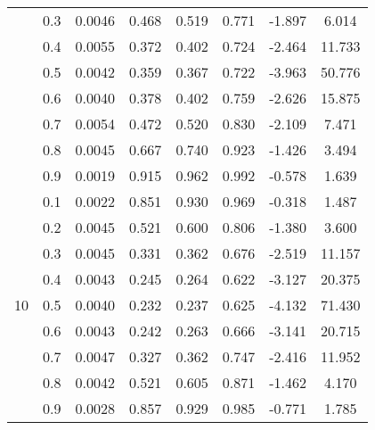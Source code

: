 \documentclass[11pt,a4paper]{report}
\begin{document}
\begin{longtable}{ | c | c || c | c | c | c | c | c | }
 & 0.3 & 0.0046 & 0.468 & 0.519 & 0.771 & -1.897 & 6.014 \\
 & 0.4 & 0.0055 & 0.372 & 0.402 & 0.724 & -2.464 & 11.733 \\
 & 0.5 & 0.0042 & 0.359 & 0.367 & 0.722 & -3.963 & 50.776 \\
 & 0.6 & 0.0040 & 0.378 & 0.402 & 0.759 & -2.626 & 15.875 \\
 & 0.7 & 0.0054 & 0.472 & 0.520 & 0.830 & -2.109 & 7.471 \\
 & 0.8 & 0.0045 & 0.667 & 0.740 & 0.923 & -1.426 & 3.494 \\
 & 0.9 & 0.0019 & 0.915 & 0.962 & 0.992 & -0.578 & 1.639 \\
 \hline
\multirow{9}{*}{10} & 0.1 & 0.0022 & 0.851 & 0.930 & 0.969 & -0.318 & 1.487 \\
 & 0.2 & 0.0045 & 0.521 & 0.600 & 0.806 & -1.380 & 3.600 \\
 & 0.3 & 0.0045 & 0.331 & 0.362 & 0.676 & -2.519 & 11.157 \\
 & 0.4 & 0.0043 & 0.245 & 0.264 & 0.622 & -3.127 & 20.375 \\
 & 0.5 & 0.0040 & 0.232 & 0.237 & 0.625 & -4.132 & 71.430 \\
 & 0.6 & 0.0043 & 0.242 & 0.263 & 0.666 & -3.141 & 20.715 \\
 & 0.7 & 0.0047 & 0.327 & 0.362 & 0.747 & -2.416 & 11.952 \\
 & 0.8 & 0.0042 & 0.521 & 0.605 & 0.871 & -1.462 & 4.170 \\
 & 0.9 & 0.0028 & 0.857 & 0.929 & 0.985 & -0.771 & 1.785 \\
 \hline
\hline
\end{longtable}
\end{document}

